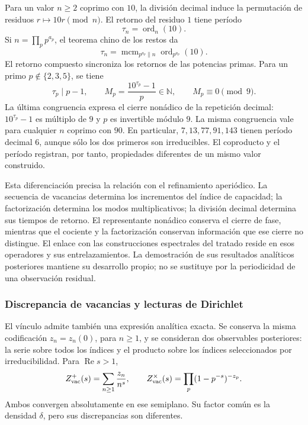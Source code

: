 Para un valor \(n\geq2\) coprimo con \(10\), la división decimal induce la
permutación de residuos \(r\mapsto10r\pmod n\). El retorno del residuo
\(1\) tiene período
\[
 \tau_n=\operatorname{ord}_n(10).
\]
Si \(n=\prod_p p^{a_p}\), el teorema chino de los restos da
\[
 \tau_n=\operatorname{mcm}_{p^{a_p}\parallel n}
                    \operatorname{ord}_{p^{a_p}}(10).
\]
El retorno compuesto sincroniza los retornos de las potencias primas.
Para un primo \(p\notin\{2,3,5\}\), se tiene
\[
 \tau_p\mid p-1,\qquad
 M_p=\frac{10^{\tau_p}-1}{p}\in\mathbb N,
 \qquad M_p\equiv0\pmod9.
\]
La última congruencia expresa el cierre nonádico de la repetición decimal:
\(10^{\tau_p}-1\) es múltiplo de \(9\) y \(p\) es invertible módulo
\(9\). La misma congruencia vale para cualquier \(n\) coprimo con
\(90\). En particular, \(7,13,77,91,143\) tienen período decimal \(6\),
aunque sólo los dos primeros son irreducibles. El coproducto y el período
registran, por tanto, propiedades diferentes de un mismo valor construido.

Esta diferenciación precisa la relación con el refinamiento aperiódico.
La secuencia de vacancias determina los incrementos del índice de
capacidad; la factorización determina los modos multiplicativos; la
división decimal determina sus tiempos de retorno. El representante
nonádico conserva el cierre de fase, mientras que el cociente y la
factorización conservan información que ese cierre no distingue. El
enlace con las construcciones espectrales del tratado reside en esos
operadores y sus entrelazamientos. La demostración de sus resultados
analíticos posteriores mantiene su desarrollo propio; no se sustituye por
la periodicidad de una observación residual.

\subsubsection{Discrepancia de vacancias y lecturas de Dirichlet}

El vínculo admite también una expresión analítica exacta. Se conserva la
misma codificación \(z_n=z_n(0)\), para \(n\geq1\), y se consideran
dos observables posteriores: la serie sobre todos los índices y el
producto sobre los índices seleccionados por irreducibilidad. Para
\(\operatorname{Re}s>1\),
\[
 Z_{\rm vac}^{+}(s)=\sum_{n\geq1}\frac{z_n}{n^s},\qquad
 Z_{\rm vac}^{\times}(s)=\prod_p(1-p^{-s})^{-z_p}.
\]
Ambos convergen absolutamente en ese semiplano. Su factor común es la
densidad \(\delta\), pero sus discrepancias son diferentes.

